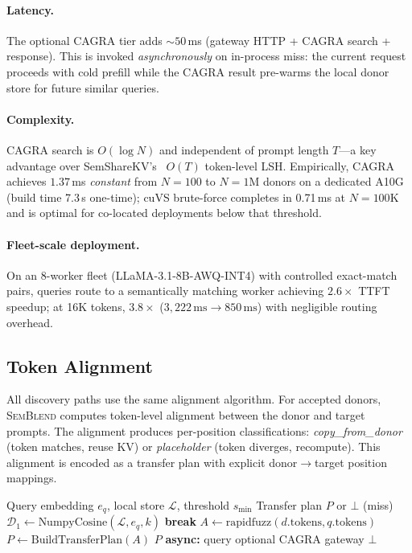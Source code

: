 \documentclass[10pt,twocolumn]{article}
\newcommand{\semblend}{\textsc{SemBlend}\xspace}
\begin{document}
\paragraph{Latency.}
The optional CAGRA tier adds ${\sim}50$\,ms (gateway HTTP + CAGRA search
+ response). This is invoked \emph{asynchronously} on in-process miss:
the current request proceeds with cold prefill while the CAGRA
result pre-warms the local donor store for future similar queries.

\paragraph{Complexity.}
CAGRA search is $O(\log N)$ and independent of prompt length $T$---a
key advantage over SemShareKV's~\cite{semsharekv} $O(T)$ token-level
LSH. Empirically, CAGRA achieves $\mathbf{1.37}$\,ms \emph{constant}
from $N{=}100$ to $N{=}1\text{M}$ donors on a dedicated A10G
(build time 7.3\,s one-time); cuVS brute-force completes in 0.71\,ms
at $N{=}100\text{K}$ and is optimal for co-located
deployments below that threshold.

\paragraph{Fleet-scale deployment.}
On an 8-worker fleet (LLaMA-3.1-8B-AWQ-INT4) with controlled
exact-match pairs, queries route to a semantically matching worker
achieving $2.6\times$ TTFT speedup; at 16K tokens, $3.8\times$
($3{,}222\,\text{ms} \to 850\,\text{ms}$) with negligible routing overhead.

\subsection{Token Alignment}
\label{sec:alignment}

All discovery paths use the same alignment algorithm. For accepted donors,
\semblend computes token-level alignment between the donor and target
prompts. The alignment produces per-position classifications:
\emph{copy\_from\_donor} (token matches, reuse KV) or
\emph{placeholder} (token diverges, recompute). This alignment is
encoded as a transfer plan with explicit donor$\to$target position
mappings.

\begin{algorithm}[t]
\caption{Donor Discovery}
\label{alg:delta}
\begin{algorithmic}[1]
\Require Query embedding $e_q$, local store $\mathcal{L}$, threshold
  $s_{\min}$
\Ensure Transfer plan $P$ or $\bot$ (miss)
\State $\mathcal{D}_1 \gets \text{NumpyCosine}(\mathcal{L}, e_q, k)$
   \textbf{break} \EndIf
  \State $A \gets \text{rapidfuzz}(d.\text{tokens}, q.\text{tokens})$
  \State $P \gets \text{BuildTransferPlan}(A)$
    \State \Return $P$
  \EndIf
\EndFor
\State \textbf{async:} query optional CAGRA gateway 
\State \Return $\bot$
\end{algorithmic}
\end{algorithm}
\end{document}
